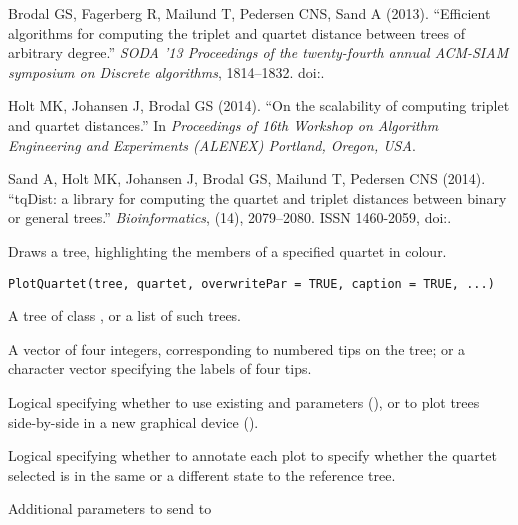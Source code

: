 \documentclass[a4paper]{book}
\begin{document}
%
\begin{References}\relax

Brodal GS, Fagerberg R, Mailund T, Pedersen CNS, Sand A (2013).
``Efficient algorithms for computing the triplet and quartet distance between trees of arbitrary degree.''
\emph{SODA '13 Proceedings of the twenty-fourth annual ACM-SIAM symposium on Discrete algorithms}, 1814--1832.
doi:\nobreakspace{}.

Holt MK, Johansen J, Brodal GS (2014).
``On the scalability of computing triplet and quartet distances.''
In \emph{Proceedings of 16th Workshop on Algorithm Engineering and Experiments (ALENEX) Portland, Oregon, USA}.

Sand A, Holt MK, Johansen J, Brodal GS, Mailund T, Pedersen CNS (2014).
``tqDist: a library for computing the quartet and triplet distances between binary or general trees.''
\emph{Bioinformatics}, (14), 2079--2080.
ISSN 1460-2059, doi:\nobreakspace{}.

\end{References}
%
\begin{Description}\relax
Draws a tree, highlighting the members of a specified quartet in colour.
\end{Description}
%
\begin{Usage}
\begin{verbatim}
PlotQuartet(tree, quartet, overwritePar = TRUE, caption = TRUE, ...)
\end{verbatim}
\end{Usage}
%
\begin{Arguments}
\begin{ldescription}
\item[\code{tree}] A tree of class , or a list of such trees.

\item[\code{quartet}] A vector of four integers, corresponding to numbered tips on
the tree; or a character vector specifying the labels of four
tips.

\item[\code{overwritePar}] Logical specifying whether to use existing
  and  parameters
(),
or to plot trees side-by-side in a new graphical device ().

\item[\code{caption}] Logical specifying whether to annotate each plot to specify
whether the quartet selected is in the same or a different state to the
reference tree.

\item[\code{...}] Additional parameters to send to 
\end{ldescription}
\end{Arguments}
\end{document}
